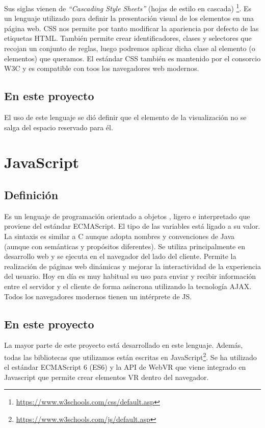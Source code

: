 \documentclass[a4paper, 12pt]{book}
\begin{document}
Sus siglas vienen de \textit{“Cascading Style Sheets”} (hojas de estilo en cascada)\cite{gasston:_cssguide} \footnote{\url{https://www.w3schools.com/css/default.asp}}. Es un lenguaje utilizado para definir la presentación visual de los elementos en una página web. CSS nos permite por tanto modificar la apariencia por defecto de las etiquetas HTML. También permite crear identificadores, clases y selectores que recojan un conjunto de reglas, luego podremos aplicar dicha clase al elemento (o elementos) que queramos. El estándar CSS también es mantenido por el consorcio W3C y es compatible con toos los navegadores web modernos.

\subsection{En este proyecto}

El uso de este lenguaje se dió definir que el elemento de la visualización no se salga del espacio reservado para él.


\section{JavaScript}
\label{sec:js}
\subsection{Definición}
Es un lenguaje de programación orientado a objetos \cite{flanagan:_jsguide}, ligero e interpretado que proviene del estándar ECMAScript.  El tipo de las variables está ligado a su valor. La sintaxis es similar a C aunque adopta nombres y convenciones de Java (aunque con semánticas y propósitos diferentes). Se utiliza principalmente en desarrollo web y se ejecuta en el navegador del lado del cliente. Permite la realización de páginas web dinámicas y mejorar la interactividad de la experiencia del usuario. Hoy en día es muy habitual su uso para enviar y recibir información entre el servidor y el cliente de forma asíncrona utilizando la tecnología AJAX. Todos los navegadores modernos tienen un intérprete de JS.

\subsection{En este proyecto}

La mayor parte de este proyecto está desarrollado en este lenguaje. Además, todas las bibliotecas que utilizamos están escritas en JavaScript\footnote{\url{https://www.w3schools.com/js/default.asp}}. Se ha utilizado el estándar ECMAScript 6 (ES6) y la API de WebVR que viene integrado en Javascript que permite crear elementos VR dentro del navegador.
\end{document}
